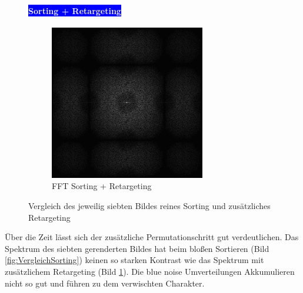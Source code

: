 \begin{figure}[H]
\begin{tcolorbox}[sidebyside,title=Vergleich mit/ohne Retargeting]
    \paragraph{\hfill\colorbox{blue}{\textcolor{white}{Sorting + Retargeting}}}
        \centering
        \begin{subfigure}{0.5\textwidth}
            \centering\includegraphics[width=\linewidth]{content/TemporalerAlg/Bilder/Retargeting/Spektren/Ausschnitt7.png}
            \caption{FFT Sorting + Retargeting}
            \label{fig:VergleichRetargeting}
        \end{subfigure}
    \end{tcolorbox}
    \caption{Vergleich des jeweilig siebten Bildes reines Sorting und zusätzliches Retargeting}
    \label{fig:VergleichBild7}
\end{figure}

Über die Zeit lässt sich der zusätzliche Permutationschritt gut verdeutlichen. Das Spektrum des siebten gerenderten Bildes 
hat beim bloßen Sortieren (Bild \ref{fig:VergleichSorting}) keinen so starken Kontrast wie das Spektrum mit 
zusätzlichem Retargeting (Bild \ref{fig:VergleichRetargeting}). Die blue noise Umverteilungen Akkumulieren nicht so gut 
und führen zu dem verwischten Charakter. 